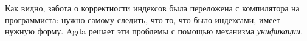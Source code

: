 \begin{code}%
\>  \AgdaSymbol{(} \AgdaSymbol{:} \AgdaSymbol{)} \AgdaSymbol{(} \AgdaSymbol{:} \AgdaSymbol{)} \AgdaSymbol{:}  \<%
\\
\>[0]\<[2]%
\>[2]\AgdaInductiveConstructor{[]} \<[6]%
\>[6]\AgdaSymbol{:} \AgdaSymbol{(}  \AgdaSymbol{)}    \<%
\\
\>[0]\<[2]%
\>[2] \AgdaSymbol{:}  \AgdaSymbol{\{}\AgdaSymbol{\}}  \AgdaSymbol{(}   \AgdaSymbol{)}          \<%
\end{code}

Как видно, забота о корректности индексов была переложена с
компилятора на программиста: нужно самому следить, что то, что было
индексами, имеет нужную форму. Agda решает эти проблемы с помощью механизма \emph{унификации}.

